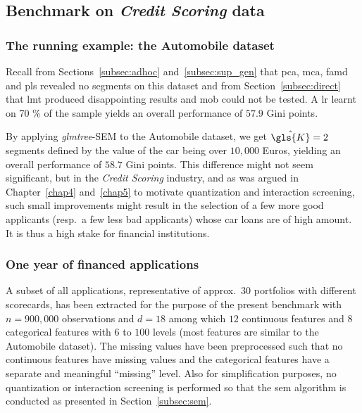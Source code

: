 \subsection{Benchmark on \textit{Credit Scoring} data}

\subsubsection{The running example: the Automobile dataset}

Recall from Sections~\ref{subsec:adhoc} and~\ref{subsec:sup_gen} that \gls{pca}, \gls{mca}, \gls{famd} and \gls{pls} revealed no segments on this dataset and from Section~\ref{subsec:direct} that \gls{lmt} produced disappointing results and \gls{mob} could not be tested. A \gls{lr} learnt on 70 \% of the sample yields an overall performance of $57.9$ Gini points.

By applying \textit{glmtree}-SEM to the Automobile dataset, we get $\hat{\gls{K}} = 2$ segments defined by the 
value of the car being over $10{,}000$ Euros, yielding an overall performance of $58.7$ Gini points. This difference might not seem significant, but in the \textit{Credit Scoring} industry, and as was argued in Chapter~\ref{chap4} and~\ref{chap5} to motivate quantization and interaction screening, such small improvements might result in the selection of a few more good applicants (resp.\ a few less bad applicants) whose car loans are of high amount. It is thus a high stake for financial institutions.

%

\subsubsection{One year of financed applications}

A subset of all applications, representative of approx.\ $30$ portfolios with different scorecards, has been extracted for the purpose of the present benchmark with $n = 900{,}000$ observations and $d = 18$ among which $12$ continuous features and $8$ categorical features with $6$ to $100$ levels (most features are similar to the Automobile dataset). The missing values have been preprocessed such that no continuous features have missing values and the categorical features have a separate and meaningful ``missing'' level. Also for simplification purposes, no quantization or interaction screening is performed so that the \gls{sem} algorithm is conducted as presented in Section~\ref{subsec:sem}.

